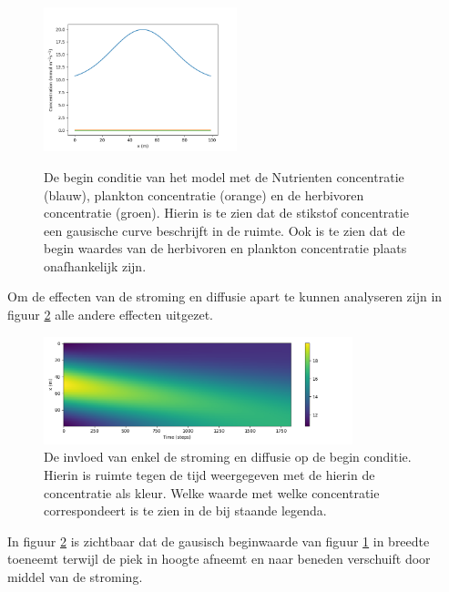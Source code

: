 \begin{figure}[H]
    \centering
    {\includegraphics[width=0.5\textwidth]{figures/Inital_Condition.png}}
    \caption{ De begin conditie van het model met de Nutrienten concentratie (blauw), plankton concentratie (orange) en de herbivoren concentratie (groen). Hierin is te zien dat de stikstof concentratie een gausische curve beschrijft in de ruimte. Ook is te zien dat de begin waardes van de herbivoren en plankton concentratie plaats onafhankelijk zijn.
    }
    \label{fig:Res:IC}
\end{figure}

Om de effecten van de stroming en diffusie apart te kunnen analyseren zijn in figuur \ref{fig:Res:Color0} alle andere effecten uitgezet. 
\begin{figure}[H]
    \centering
    \includegraphics[width=0.8\textwidth]{figures/color_plot_0Flow.png}
   \hfill
    \caption{De invloed van enkel de stroming en diffusie op de begin conditie. Hierin is ruimte tegen de tijd weergegeven met de hierin de concentratie als kleur. Welke waarde met welke concentratie correspondeert is te zien in de bij staande legenda.}
    \label{fig:Res:Color0}
\end{figure}

In figuur \ref{fig:Res:Color0} is zichtbaar dat de gausisch beginwaarde van figuur \ref{fig:Res:IC} in breedte toeneemt terwijl de piek in hoogte afneemt en naar beneden verschuift door middel van de stroming.

